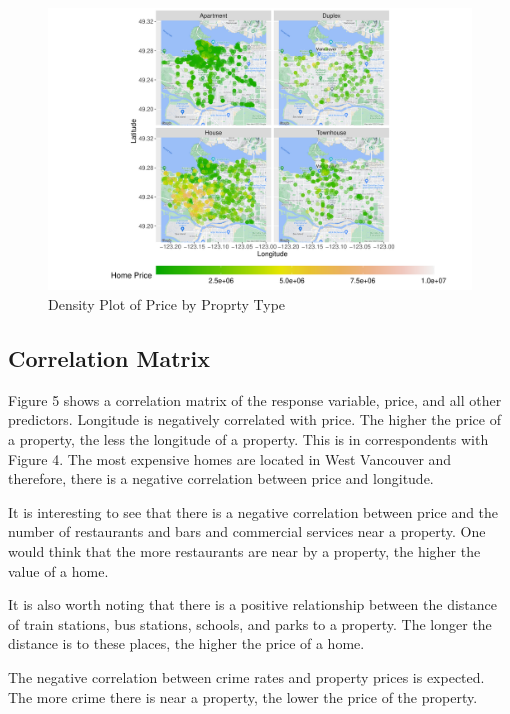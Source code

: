 \documentclass[
]{article}
\begin{document}
\begin{figure}

{\centering \includegraphics{final_report_files/figure-latex/unnamed-chunk-7-1} 

}

\caption{Density Plot of Price by Proprty Type}\label{fig:unnamed-chunk-7}
\end{figure}

\hypertarget{correlation-matrix}{%
\subsection{Correlation Matrix}\label{correlation-matrix}}

Figure 5 shows a correlation matrix of the response variable, price, and
all other predictors. Longitude is negatively correlated with price. The
higher the price of a property, the less the longitude of a property.
This is in correspondents with Figure 4. The most expensive homes are
located in West Vancouver and therefore, there is a negative correlation
between price and longitude.

It is interesting to see that there is a negative correlation between
price and the number of restaurants and bars and commercial services
near a property. One would think that the more restaurants are near by a
property, the higher the value of a home.

It is also worth noting that there is a positive relationship between
the distance of train stations, bus stations, schools, and parks to a
property. The longer the distance is to these places, the higher the
price of a home.

The negative correlation between crime rates and property prices is
expected. The more crime there is near a property, the lower the price
of the property.
\end{document}
